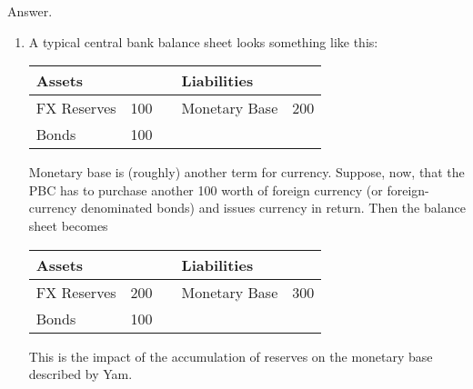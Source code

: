 \documentclass[letterpaper,12pt]{article}
\begin{document}
\begin{enumerate}
Answer. 
\begin{enumerate}
\item A typical central bank balance sheet looks something like this:
%
\begin{center}
\begin{tabular}{lrclr}
               Assets  &     &&     Liabilities                     \\  
               \hline 
               FX Reserves &  100 &&     Monetary Base &  200   \\    
               Bonds   & 100 && \\
\end{tabular}
\end{center}
%
Monetary base is (roughly) another term for currency.  
Suppose, now, that the PBC has to purchase another 100 worth of 
foreign currency (or foreign-currency denominated bonds) 
and issues currency in return.  
Then the balance sheet becomes 
%
\begin{center}
\begin{tabular}{lrclr}
               Assets  &     &&     Liabilities                     \\  
               \hline 
               FX Reserves &  200 &&     Monetary Base &  300   \\    
               Bonds   & 100 && \\
\end{tabular}
\end{center}
%
This is the impact of the accumulation of reserves on the monetary base described by Yam.  



\end{enumerate}
\end{enumerate}
\end{document}

